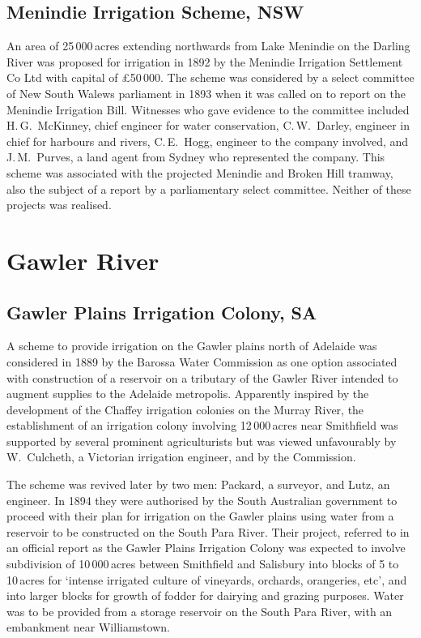 \subsection*{Menindie Irrigation Scheme, NSW}

An area of 25\,000\,acres extending northwards from Lake Menindie on
the Darling River was proposed for irrigation in 1892 by the Menindie
Irrigation Settlement Co Ltd with capital of \pounds50\,000.  The
scheme was considered by a select committee of New South Walews
parliament in 1893 when it was called on to report on the Menindie
Irrigation Bill.  Witnesses who gave evidence to the committee
included H.\,G.~McKinney, chief engineer for water conservation,
C.\,W.~Darley, engineer in chief for harbours and rivers, C.\,E.~Hogg,
engineer to the company involved, and J.\,M.~Purves, a land agent from
Sydney who represented the company.  This scheme was associated with
the projected Menindie and Broken Hill tramway, also the subject of a
report by a parliamentary select committee.  Neither of these projects
was realised.

\section*{Gawler River}

\subsection*{Gawler Plains Irrigation Colony, SA}

A scheme to provide irrigation on the Gawler plains north of Adelaide
was considered in 1889 by the Barossa Water Commission as one option
associated with construction of a reservoir on a tributary of the
Gawler River intended to augment supplies to the Adelaide metropolis.
Apparently inspired by the development of the Chaffey irrigation
colonies on the Murray River, the establishment of an irrigation
colony involving 12\,000\,acres near Smithfield was supported by several
prominent agriculturists but was viewed unfavourably by W.~Culcheth, a
Victorian irrigation engineer, and by the Commission.

The scheme was revived later by two men: Packard, a surveyor, and
Lutz, an engineer.  In 1894 they were authorised by the South
Australian government to proceed with their plan for irrigation on the
Gawler plains using water from a reservoir to be constructed on the
South Para River.  Their project, referred to in an official report as
the Gawler Plains Irrigation Colony was expected to involve
subdivision of 10\,000\,acres between Smithfield and Salisbury into
blocks of 5 to 10\,acres for `intense irrigated culture of vineyards,
orchards, orangeries, etc', and into larger blocks for growth of
fodder for dairying and grazing purposes.  Water was to be provided
from a storage reservoir on the South Para River, with an embankment
near Williamstown.

